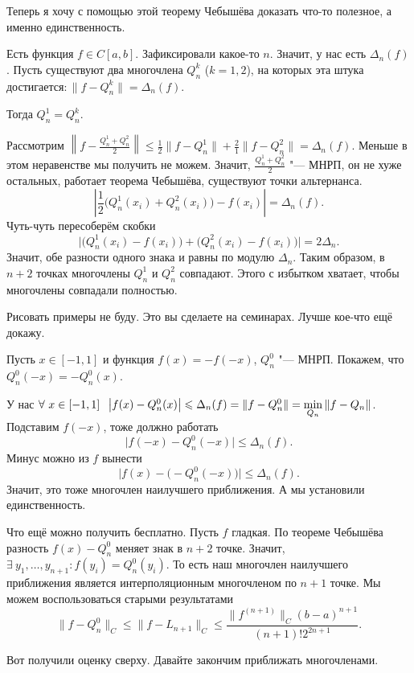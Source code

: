 Теперь я хочу с помощью этой теорему Чебышёва доказать что-то полезное, а именно единственность.
\begin{Ut}
  Есть функция $f\in C[a,b]$. Зафиксировали какое-то $n$. Значит, у нас есть $\Delta_n(f)$. Пусть существуют два многочлена $Q_n^k$ ($k=1,2$), на которых эта штука достигается$\colon \|f - Q_n^k\| = \Delta_n(f)$. 
  
  Тогда $Q_n^1= Q_n^k$.
\end{Ut}
\begin{Proof}
  Рассмотрим $\left\| f - \frac{Q_n^1 + Q_n^2}2\right\|\le \frac12 \|f- Q^1_n\| + \frac21 \|f - Q_n^2\| = \Delta_n(f)$. Меньше в этом неравенстве мы получить не можем. Значит, $\frac{Q_n^1+Q_n^2}2$ "--- МНРП, он не хуже остальных, работает теорема Чебышёва, существуют точки альтернанса.
  \[
    \left|\frac12 \big(Q_n^1(x_i) + Q_n^2(x_i)\big) - f(x_i)\right| = \Delta_n(f).
  \]
  Чуть-чуть пересоберём скобки
  \[
    \Big| \big(Q_n^1(x_i) - f(x_i)\big) + \big(Q_n^2(x_i) - f(x_i)\big)\Big| = 2\Delta_n.
   \]
   Значит, обе разности одного знака и равны по модулю $\Delta_n$. Таким образом, в $n+2$ точках многочлены $Q_n^1$ и $Q_n^2$ совпадают. Этого с избытком хватает, чтобы многочлены совпадали полностью.
\end{Proof}

Рисовать примеры не буду. Это вы сделаете на семинарах. Лучше кое-что ещё докажу.

Пусть $x\in[-1,1]$ и функция $f(x) = - f(-x)$, $Q_n^0$ "--- МНРП. Покажем, что $Q_n^0(-x) = -Q_n^0(x)$.

У нас $\forall\ x\in [-1,1]\hskip .75em plus.1em minus.08em\relax \big|f(x)- Q_n^0(x)\big|\leqslant \Delta_n(f) = \|f - Q_n^0\| = \min\limits_{Q_n}\|f-Q_n\|$. Подставим $f(-x)$, тоже должно работать
\[
  \big|f(-x) - Q_n^0(-x)\big|\le \Delta_n(f).
\]
Минус можно из $f$ вынести
\[
  \Big|f(x) - \big(-Q_n^0(-x)\big)\Big|\le \Delta_n(f).
\]
Значит, это тоже многочлен наилучшего приближения. А мы установили единственность.


Что ещё можно получить бесплатно. Пусть $f$ гладкая. По теореме Чебышёва разность $f(x) - Q_n^0$ меняет знак в $n+2$ точке. Значит, $\exists\ y_1,\dots,y_{n+1}\colon f(y_i) = Q_n^0(y_i)$. То есть наш многочлен наилучшего приближения является интерполяционным многочленом по $n+1$ точке. Мы можем воспользоваться старыми результатами
\[
  \|f - Q_n^0\|_C\le \| f - L_{n+1}\|_C\le \frac{\| f^{(n+1)}\|_C (b-a)^{n+1}}{(n+1)! 2^{2n + 1}}.
\]

Вот получили оценку сверху. Давайте закончим приближать многочленами.

